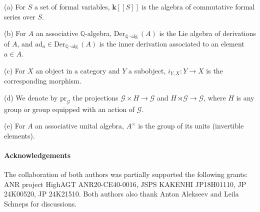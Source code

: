 \documentclass[10pt]{amsart}
\newcommand{\Add}[1]{\textcolor{black}{#1}} %
\numberwithin{equation}{subsection}
\begin{document}



\begin{notation}\label{NOTATION}
(a) For $S$ a set of formal variables, $\mathbf k[[S]]$ is the algebra of commutative formal series over $S$.   

(b) For $A$ an associative $\mathbb Q$-algebra, $\mathrm{Der}_{\mathbb Q\operatorname{-alg}}(A)$ is the Lie algebra
of derivations of $A$, and $\mathrm{ad}_a\in \mathrm{Der}_{\mathbb Q\operatorname{-alg}}(A)$ is the inner derivation 
associated to an element $a\in A$. 

(c) For $X$ an object in a category and $Y$ a subobject, $i_{Y,X} : Y\to X$ is
the corresponding morphism. 

(d) We denote by $\mathrm{pr}_{\mathcal G}$ the projections $\mathcal G\times H\to\mathcal G$ and $H\rtimes\mathcal G\to \mathcal G$, 
where $H$ is any group or group equipped with an action of $\mathcal G$. 

(e) For $A$ an associative unital algebra, $A^\times$ is the group of its units (invertible elements). 
\end{notation}

\paragraph{\textbf{Acknowledgements}} 
The collaboration of both authors was partially supported the following grants:  
ANR project HighAGT ANR20-CE40-0016, JSPS KAKENHI JP18H01110, JP 24K00520,  JP 24K21510. 
Both authors 
also thank Anton Alekseev and Leila Schneps for discussions. 
    
\end{document}
